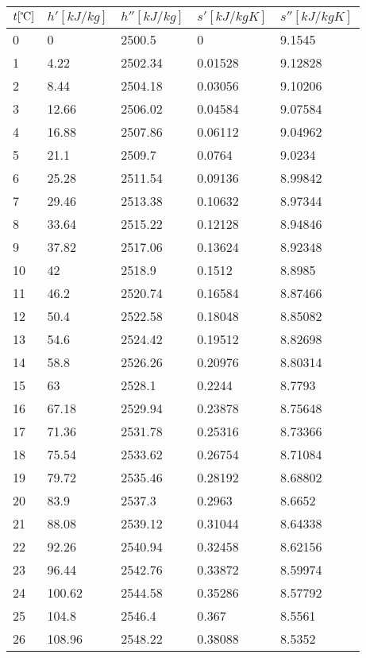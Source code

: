 \documentclass[twocolumn]{article}
\begin{document}
\begin{tabular}{l|l|l|l|l}
	$t [\text{\textcelsius}] $ & $h' [kJ/kg]$ & $h'' [kJ/kg]$ & $s' [kJ/kg K] $ & $s'' [kJ/kg K]$ \\ \hline
0	&	0	&	2500.5	&	0	&	9.1545 \\ \hline
1	&	4.22	&	2502.34	&	0.01528	&	9.12828 \\ \hline
2	&	8.44	&	2504.18	&	0.03056	&	9.10206 \\ \hline
3	&	12.66	&	2506.02	&	0.04584	&	9.07584 \\ \hline
4	&	16.88	&	2507.86	&	0.06112	&	9.04962 \\ \hline
5	&	21.1	&	2509.7	&	0.0764	&	9.0234 \\ \hline
6	&	25.28	&	2511.54	&	0.09136	&	8.99842 \\ \hline
7	&	29.46	&	2513.38	&	0.10632	&	8.97344 \\ \hline
8	&	33.64	&	2515.22	&	0.12128	&	8.94846 \\ \hline
9	&	37.82	&	2517.06	&	0.13624	&	8.92348 \\ \hline
10	&	42	&	2518.9	&	0.1512	&	8.8985 \\ \hline
11	&	46.2	&	2520.74	&	0.16584	&	8.87466 \\ \hline
12	&	50.4	&	2522.58	&	0.18048	&	8.85082 \\ \hline
13	&	54.6	&	2524.42	&	0.19512	&	8.82698 \\ \hline
14	&	58.8	&	2526.26	&	0.20976	&	8.80314 \\ \hline
15	&	63	&	2528.1	&	0.2244	&	8.7793 \\ \hline
16	&	67.18	&	2529.94	&	0.23878	&	8.75648 \\ \hline
17	&	71.36	&	2531.78	&	0.25316	&	8.73366 \\ \hline
18	&	75.54	&	2533.62	&	0.26754	&	8.71084 \\ \hline
19	&	79.72	&	2535.46	&	0.28192	&	8.68802 \\ \hline
20	&	83.9	&	2537.3	&	0.2963	&	8.6652 \\ \hline
21	&	88.08	&	2539.12	&	0.31044	&	8.64338 \\ \hline
22	&	92.26	&	2540.94	&	0.32458	&	8.62156 \\ \hline
23	&	96.44	&	2542.76	&	0.33872	&	8.59974 \\ \hline
24	&	100.62	&	2544.58	&	0.35286	&	8.57792 \\ \hline
25	&	104.8	&	2546.4	&	0.367	&	8.5561 \\ \hline
26	&	108.96	&	2548.22	&	0.38088	&	8.5352 \\ \hline

\end{tabular}
\end{document}
